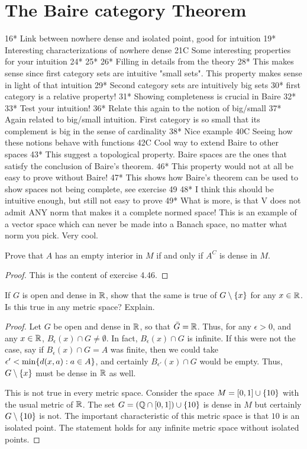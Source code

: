 \section{The Baire category Theorem}

16* Link between nowhere dense and isolated point, good for intuition 
19* Interesting characterizations of nowhere dense 
21C Some interesting properties for your intuition 
24*
25*
26* Filling in details from the theory 
28* This makes sense since first category sets are intuitive "small sets". This property makes sense in light of that intuition
29* Second category sets are intuitively big sets 
30* first category is a relative property!
31* Showing completeness is crucial in Baire 
32* 
33* Test your intuition! 
36* Relate this again to the notion of big/small 
37* Again related to big/small intuition. First category is so small that its complement is big in the sense of cardinality 
38* Nice example 
40C Seeing how these notions behave with functions 
42C Cool way to extend Baire to other spaces 
43* This suggest a topological property. Baire spaces are the ones that satisfy the conclusion of Baire's theorem.
46* This property would not at all be easy to prove without Baire!
47* This shows how Baire's theorem can be used to show spaces not being complete, see exercise 49
48* I think this should be intuitive enough, but still not easy to prove 
49* What is more, is that V does not admit ANY norm that makes it a complete normed space! This is an example of a vector space which can never be made into a Banach space, no matter what norm you pick. Very cool. 


\begin{exercise}{14}
Prove that $A$ has an empty interior in $M$ if and only if $A^C$ is dense in $M$.
\end{exercise}
\begin{proof}
This is the content of exercise 4.46.
\end{proof} 

\begin{exercise}{15}
If $G$ is open and dense in $\mathbb{R}$, show that the same is true of $G\setminus\{x\}$ for any $x\in\mathbb{R}$. 
Is this true in any metric space?
Explain.
\end{exercise}
\begin{proof}
Let $G$ be open and dense in $\mathbb{R}$, so that $\bar{G}=\mathbb{R}$.
Thus, for any $\epsilon>0$, and any $x\in\mathbb{R}$, $B_\epsilon(x)\cap G\neq \emptyset$.
In fact, $B_\epsilon(x)\cap G$ is infinite.
If this were not the case, say if $B_\epsilon(x)\cap G = A$ was finite, then we could take $\epsilon' < \min\{d(x,a): a\in A\}$, and certainly $B_{\epsilon'}(x)\cap G$ would be empty. 
Thus, $G\setminus\{x\}$ must be dense in $\mathbb{R}$ as well.

This is not true in every metric space.
Consider the space $M=[0,1]\cup \{10\}$ with the usual metric of $\mathbb{R}$.
The set $G = (\mathbb{Q}\cap[0,1]) \cup \{10\}$ is dense in $M$ but certainly $G\setminus\{10\}$ is not.
The important characteristic of this metric space is that $10$ is an isolated point.
The statement holds for any infinite metric space without isolated points.
\end{proof} 

